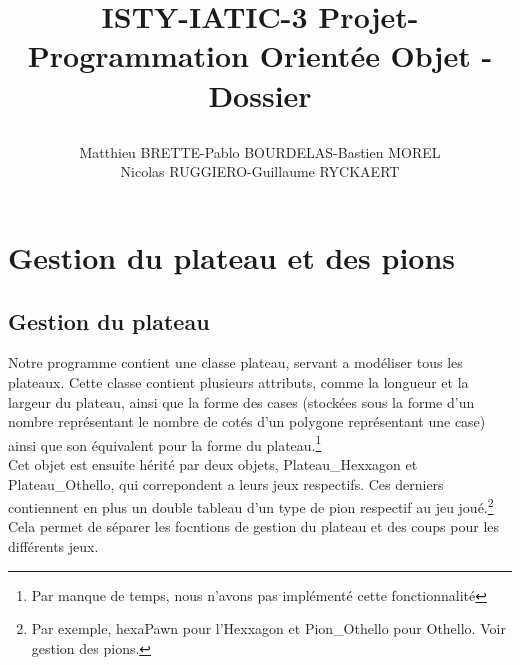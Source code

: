 \documentclass{report}
\begin{document}
\title{%
    \begin{minipage}\linewidth
        \centering
        ISTY-IATIC-3
        \vskip 3pt
        \large Projet-Programmation Orientée Objet - Dossier
    \author{Matthieu BRETTE-Pablo BOURDELAS-Bastien MOREL\\Nicolas RUGGIERO-Guillaume RYCKAERT}
    \end{minipage}
 }
 \maketitle
 \section*{Gestion du plateau et des pions}
 \subsection*{Gestion du plateau}

 Notre programme contient une classe plateau, servant a modéliser tous les plateaux. Cette classe contient plusieurs attributs, comme la longueur et la largeur du plateau, ainsi que la forme des cases (stockées sous la forme d'un nombre représentant le nombre de cotés d'un polygone représentant une case) ainsi que son équivalent pour la forme du plateau.\footnote{Par manque de temps, nous n'avons pas implémenté cette fonctionnalité} \\

 Cet objet est ensuite hérité par deux objets, Plateau\_Hexxagon et Plateau\_Othello, qui correpondent a leurs jeux respectifs. Ces derniers contiennent en plus un double tableau d'un type de pion respectif au jeu joué.\footnote{ Par exemple, hexaPawn pour l'Hexxagon et Pion\_Othello pour Othello. Voir gestion des pions.} Cela permet de séparer les focntions de gestion du plateau et des coups pour les différents jeux.
\end{document}

